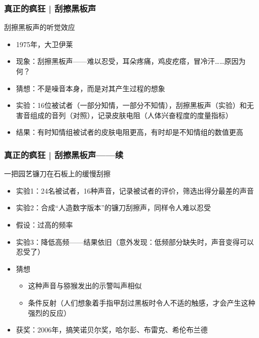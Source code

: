 \begin{frame}
  \frametitle{真正的疯狂 | 刮擦黑板声}
  \begin{block}{刮擦黑板声的听觉效应}
    \begin{itemize}
      \item 1975年，大卫\textbullet 伊莱
      \item 现象：刮擦黑板声——难以忍受，耳朵疼痛，鸡皮疙瘩，冒冷汗……原因为何？
    \pause
      \item 猜想：不是噪音本身，而是对其产生过程的想象
      \item 实验：16位被试者（一部分知情，一部分不知情），刮擦黑板声（实验）和无害音组成的音列（对照），记录皮肤电阻（人体兴奋程度的度量指标）
      \item 结果：有时知情组被试者的皮肤电阻更高，有时却是不知情组的数值更高
    \end{itemize}
  \end{block}
\end{frame}

\begin{frame}
  \frametitle{真正的疯狂 | 刮擦黑板声——续}
  \begin{block}{一把园艺镰刀在石板上的缓慢刮擦}
    \begin{itemize}
      \item 实验1：24名被试者，16种声音，记录被试者的评价，筛选出得分最差的声音
      \item 实验2：合成“人造数字版本”的镰刀刮擦声，同样令人难以忍受
      \item 假设：过高的频率
      \item 实验3：降低高频——结果依旧（意外发现：低频部分缺失时，声音变得可以忍受了）
      \item 猜想
        \begin{itemize}
          \item 这种声音与猕猴发出的示警叫声相似
          \item 条件反射（人们想象着手指甲刮过黑板时令人不适的触感，才会产生这种强烈的反应）
        \end{itemize}
      \item 获奖：2006年，搞笑诺贝尔奖，哈尔彭、布雷克、希伦布兰德
    \end{itemize}
  \end{block}
\end{frame}

